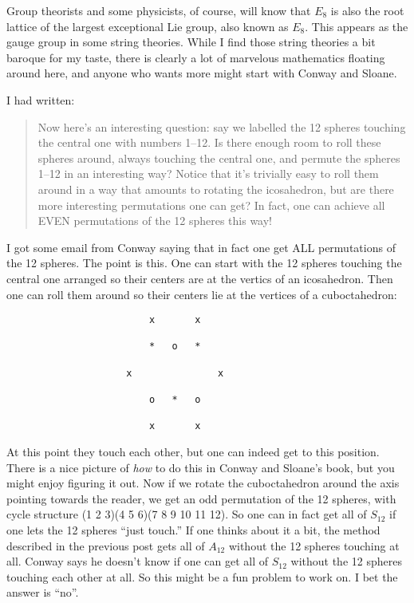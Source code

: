 Group theorists and some physicists, of course, will know that $E_8$ is also the root lattice of the largest exceptional Lie group, also known as $E_8$. This appears as the gauge group in some string theories. While I find those string theories a bit baroque for my taste, there is clearly a lot of marvelous mathematics floating around here, and anyone who wants more might start with Conway and Sloane.

\Addendum

I had written:
\begin{quote}
Now here's an interesting question: say we labelled the 12 spheres touching the central one with numbers 1--12. Is there enough room to roll these spheres around, always touching the central one, and permute the spheres 1--12 in an interesting way? Notice that it's trivially easy to roll them around in a way that amounts to rotating the icosahedron, but are there more interesting permutations one can get?
In fact, one can achieve all EVEN permutations of the 12 spheres this way!
\end{quote}
I got some email from Conway saying that in fact one get ALL permutations of the 12 spheres. The point is this. One can start with the 12 spheres touching the central one arranged so their centers are at the vertics of an icosahedron. Then one can roll them around so their centers lie at the vertices of a cuboctahedron:
\begin{verbatim}
                         x       x   

                         *   o   * 
 
                     x               x

                         o   *   o

                         x       x
\end{verbatim}
At this point they touch each other, but one can indeed get to this position. There is a nice picture of \emph{how} to do this in Conway and Sloane's book, but you might enjoy figuring it out.
Now if we rotate the cuboctahedron around the axis pointing towards the reader, we get an odd permutation of the 12 spheres, with cycle structure (1 2 3)(4 5 6)(7 8 9 10 11 12). So one can in fact get all of $S_{12}$ if one lets the 12 spheres ``just touch.'' If one thinks about it a bit, the method described in the previous post gets all of $A_{12}$ without the 12 spheres touching at all. Conway says he doesn't know if one can get all of $S_{12}$ without the 12 spheres touching each other at all. So this might be a fun problem to work on. I bet the answer is ``no''.

